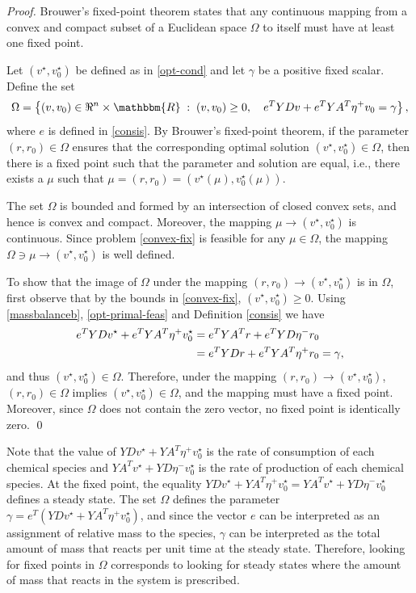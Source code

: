 \documentclass[smallextended]{svjour3}       %
\newcommand*{\0}{\mathbf{0}}
\newcommand*{\1}{\mathbf{1}}
\newcommand*{\R}{\mathbbm{R}}
\begin{document}
\begin{proof} 
	Brouwer's fixed-point theorem states that any continuous mapping from a
	convex and compact subset of a Euclidean space $\Omega$ to itself must have
	at least one fixed point. 

	Let $(v^\star,v^\star_0)$ be defined as in \eqref{opt-cond} and let $\gamma$
	be a positive fixed scalar. Define the set 
	\[
	\Omega = \left\{ (v,v_0)\in	\Re^{n}\times\R \; : \; (v,v_0)\geq 0, 
		\quad e^TYDv + e^TYA^T\eta^+v_0 = \gamma\right\},
	\]  
	where $e$ is defined in \eqref{consis}.  By Brouwer's fixed-point
	theorem, if the parameter $(r,r_0) \in \Omega$ ensures that the corresponding 
    optimal solution $(v^\star,v_0^\star) \in \Omega$, then there is a fixed point 
    such that the parameter and solution are equal, i.e., there exists a $\mu$ 
    such that $\mu = (r,r_0) = (v^\star(\mu),v_0^\star(\mu))$.  

	The set $\Omega$ is bounded and formed by an intersection of closed convex
	sets, and hence is convex and compact.  Moreover, the mapping $\mu\rightarrow
	(v^\star,v^\star_0)$ is continuous. Since problem \eqref{convex-fix} is
	feasible for any $\mu\in\Omega$, the mapping $\Omega \ni \mu \rightarrow
	(v^\star,v^\star_0)$ is well defined.

	To show that the image of $\Omega$ under the mapping $(r,r_0) \rightarrow
	(v^\star,v_0^\star)$	is in $\Omega$, first observe that by the bounds in
    \eqref{convex-fix}, $(v^\star,v^\star_0) \ge 0$.  Using \eqref{massbalanceb}, 
    \eqref{opt-primal-feas} and Definition \ref{consis}
	we have
	\begin{align}
	e^T YD v^\star + e^T YA^T \eta^+ v^\star_0 &= e^T YA^T r + e^T YD \eta^- r_0 \notag 
	\\ & = e^T YD r + e^T YA^T \eta^+r_0=\gamma, \notag 
	\end{align} 
	and thus $(v^\star,v_0^\star)\in \Omega.$
	Therefore, under the mapping $(r,r_0) \rightarrow (v^\star,v_0^\star)$,
	$(r,r_0) \in \Omega$ implies $(v^\star,v^\star_0) \in \Omega$, and the
	mapping must have a fixed point.  Moreover, since $\Omega$ does not contain
	the zero vector, no fixed point is identically zero.
    \qed
\end{proof}

Note that the value of $YDv^\star+YA^T\eta^+v^\star_0$ is the rate of
consumption of each chemical species and $YA^Tv^\star+YD\eta^-v^\star_0$ is the
rate of production of each chemical species. At the fixed point, the equality
$YDv^\star + YA^T\eta^+v^\star_0= YA^Tv^\star+YD\eta^-v^\star_0$ defines a
steady state. The set $\Omega$ defines the parameter $\gamma=e^T(YDv^\star +
YA^T\eta^+v^\star_0)$, and since the vector $e$ can be interpreted as an assignment
of relative mass to the species, $\gamma$ can be interpreted as the total
amount of mass that reacts per unit time at the steady state.  Therefore,
looking for fixed points in $\Omega$ corresponds to looking for steady states
where the amount of mass that reacts in the system is prescribed.
\end{document}
